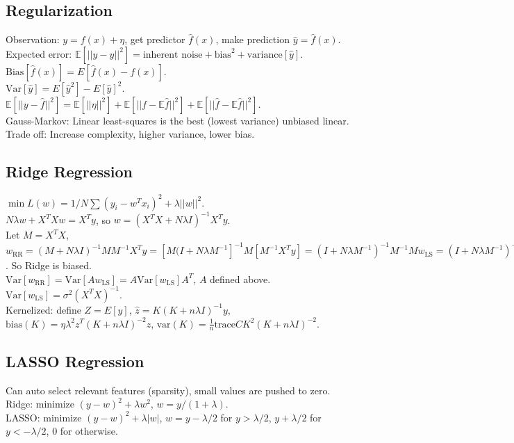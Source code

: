 \subsection*{Regularization}

Observation: $y = f(x) + \eta$, get predictor $\hat{f}(x)$, make prediction $\hat{y} = \hat{f}(x)$.\\
Expected error: $\mathbb{E}[||y - \hat{y}||^2] = \text{inherent noise} + \text{bias}^2 + \text{variance}[\hat{y}]$.\\
$\text{Bias}[\hat{f}(x)] = E[\hat{f}(x) - f(x)]$.\\
$\text{Var}[\hat{y}] = E[\hat{y}^2] - E[\hat{y}]^2$.\\
$\mathbb{E}[||y - \hat{f}||^2] = \mathbb{E}[||\eta||^2] + \mathbb{E}[||f - \mathbb{E}\hat{f}||^2] + \mathbb{E}[||\hat{f} - \mathbb{E}\hat{f}||^2]$.\\
Gauss-Markov: Linear least-squares is the best (lowest variance) unbiased linear.\\
Trade off: Increase complexity, higher variance, lower bias.

\subsection*{Ridge Regression}

$\min L(w) = 1/N \sum(y_i - w^T x_i)^2 + \lambda ||w||^2$.\\
$N \lambda w + X^T X w = X^T y$, so $w = (X^T X + N \lambda I)^{-1} X^T y$.\\
Let $M = X^T X$, $w_{\text{RR}} = (M+N\lambda I)^{-1}MM^{-1}X^Ty = [M(I+N\lambda M^{-1}]^{-1}M[M^{-1}X^T y] = (I+N\lambda M^{-1})^{-1} M^{-1}Mw_{\text{LS}} = (I + N \lambda M^{-1})^{-1} w_{\text{LS}}$. So Ridge is biased.\\
$\text{Var}[w_{\text{RR}}] = \text{Var}[A w_{\text{LS}}] = A \text{Var}[w_{\text{LS}}] A^T$, $A$ defined above.\\
$\text{Var}[w_{\text{LS}}] = \sigma^2 (X^T X)^{-1}$.\\
Kernelized: define $Z = E[y]$, $\hat{z} = K(K+n\lambda I)^{-1}y$, $\text{bias}(K) = \eta \lambda^2 z^T (K + n\lambda I)^{-2} z$, $\text{var}(K) = \frac{1}{n}\text{trace} C K^2 (K+n\lambda I)^{-2}$.

\subsection*{LASSO Regression}

Can auto select relevant features (sparsity), small values are pushed to zero.\\
Ridge: minimize $(y-w)^2 + \lambda w^2$, $w = y/(1+\lambda)$.\\
LASSO: minimize $(y-w)^2 + \lambda |w|$, $w = y-\lambda/2$ for $y > \lambda/2$, $y + \lambda / 2$ for $y < -\lambda/2$, $0$ for otherwise.

